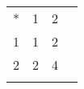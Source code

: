 \begin{table}[h]
\begin{tabular}{|l|l|l|l} 
\cline{1-3}
* & 1 & 2 & \\ 
\cline{1-3}
1 & 1 & 2 & \\ 
\cline{1-3}
2 & 2 & 4 & \\ 
\cline{1-3}
\multicolumn{1}{l}{} & \multicolumn{1}{l}{} & \multicolumn{1}{l}{} &  
\end{tabular}
\end{table}